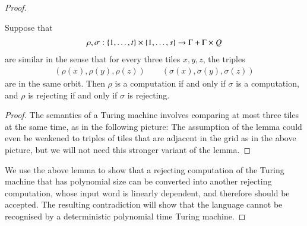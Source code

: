 \begin{proof}
\begin{lemma}\label{lem:turing-three-consistency}
	Suppose that 
	\begin{align*}
		\rho, \sigma : \{1,\ldots,t\} \times \{1,\ldots,s\} \to \Gamma + \Gamma \times Q 
	\end{align*}
	are similar in the sense that for every three tiles $x,y,z$, the triples
\begin{align*}
	(\rho(x), \rho(y), \rho(z)) \qquad ( \sigma(x), \sigma(y), \sigma(z))
\end{align*}
	are in the same orbit. Then $\rho$ is a computation if and only if $\sigma$ is a computation, and $\rho$ is rejecting if and only if $\sigma$ is rejecting. 
\end{lemma}
\begin{proof}
	 The semantics of a Turing machine involves comparing at most three tiles at the same time, as in the following picture:
	 The assumption of the lemma could even be weakened to triples of tiles that are adjacent in the grid as in the above picture, but we will not need this stronger variant of the lemma.
\end{proof}

We use the above lemma to show that a rejecting computation of the Turing machine that has polynomial size can be converted into another rejecting computation, whose input word is linearly dependent, and therefore should be accepted. The resulting contradiction will show that the language cannot be recognised by a deterministic polynomial time Turing machine.


\end{proof}

